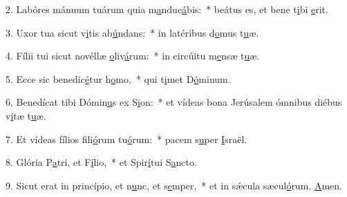 2. Labóres mánuum tuárum quia m\uline{a}nduc\uline{á}bis:~* beátus es, et bene t\uline{i}bi \uline{e}rit.\par 
3. Uxor tua sicut v\uline{i}tis ab\uline{ú}ndans:~* in latéribus d\uline{o}mus t\uline{u}æ.\par 
4. Fílii tui sicut novéllæ \uline{o}liv\uline{á}rum:~* in circúitu m\uline{e}nsæ t\uline{u}æ.\par 
5. Ecce sic benedic\uline{é}tur h\uline{o}mo,~* qui t\uline{i}met D\uline{ó}minum.\par 
6. Benedícat tibi Dómin\uline{u}s ex S\uline{i}on:~* et vídeas bona Jerúsalem ómnibus diébus v\uline{i}tæ t\uline{u}æ.\par 
7. Et vídeas fílios fili\uline{ó}rum tu\uline{ó}rum:~* pacem s\uline{u}per \uline{I}sraël.\par 
8. Glória P\uline{a}tri, et F\uline{í}lio,~* et Spir\uline{í}tui S\uline{a}ncto.\par 
9. Sicut erat in princípio, et n\uline{u}nc, et s\uline{e}mper,~* et in sǽcula sæcul\uline{ó}rum. \uline{A}men.\par 
